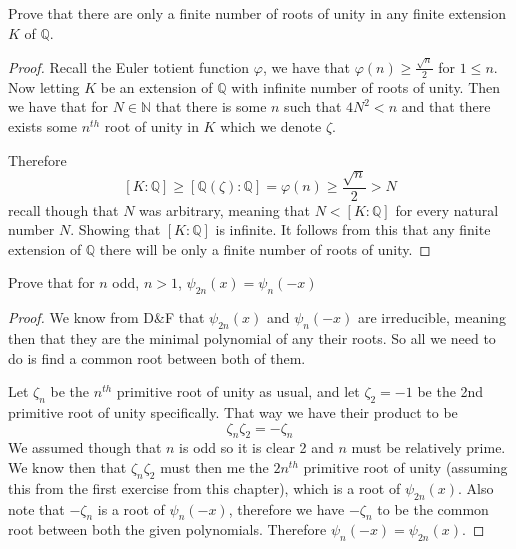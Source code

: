 \documentclass[11pt]{article}
\newenvironment{problem}[2][Problem\!]{\begin{trivlist}
\item[\hskip \labelsep {\bfseries #1}\hskip \labelsep {\bfseries #2}]}{\end{trivlist}}
\newcommand{\qq}{\mathbb Q}   %
\newcommand{\nn}{\mathbb N}   %
\renewcommand{\phi}{\varphi}
\renewcommand{\geq}{\geqslant}
\renewcommand{\leq}{\leqslant}
\newcommand{\lrb}[1]{\left[#1\right]}
\begin{document}
\begin{tcolorbox}
    \begin{problem}{13.6.5}
        Prove that there are only a finite number of roots of unity in any finite extension $K$ of $\qq$.
    \end{problem}
\end{tcolorbox}
\begin{proof}
    Recall the Euler totient function $\phi$, we have that $\phi(n) \geq \frac{\sqrt n}{2}$ for $1 \leq n$. Now letting $K$ be an extension of $\qq$ with infinite number of roots of unity. Then we have that for $N \in \nn$ that there is some $n$ such that $4N^{2} < n$ and that there exists some $n^{th}$ root of unity in $K$ which we denote $\zeta$. 

    Therefore 
    \[\lrb{K : \qq} \geq \lrb{\qq(\zeta): \qq}= \phi(n) \geq \dfrac{\sqrt n}{2} > N\]
    recall though that $N$ was arbitrary, meaning that $N < \lrb{K : \qq}$ for every natural number $N$. Showing that $\lrb{K : \qq}$ is infinite. It follows from this that any finite extension of $\qq$ there will be only a finite number of roots of unity. 
\end{proof}

\begin{tcolorbox}
    \begin{problem}{13.6.6}
        Prove that for $n$ odd, $n> 1$, $\psi_{2n}(x) = \psi_n(-x)$
    \end{problem}
\end{tcolorbox}
\begin{proof}
    We know from D\&F that $\psi_{2n}(x)$ and $\psi_n(-x)$ are irreducible, meaning then that they are the minimal polynomial of any their roots. So all we need to do is find a common root between both of them. 

    Let $\zeta_n$ be the $n^{th}$ primitive root of unity as usual, and let $\zeta_2 = -1$ be the 2nd primitive root of unity specifically. That way we have their product to be
    \[\zeta_n\zeta_2 = -\zeta_n\]
    We assumed though that $n$ is odd so it is clear 2 and $n$ must be relatively prime. We know then that $\zeta_n\zeta_2$ must then me the $2n^{th}$ primitive root of unity (assuming this from the first exercise from this chapter), which is a root of $\psi_{2n}(x)$. Also note that $-\zeta_n$ is a root of $\psi_n(-x)$, therefore we have $-\zeta_n$ to be the common root between both the given polynomials. Therefore $\psi_{n}(-x) = \psi_{2n}(x)$.
\end{proof}
\end{document}
